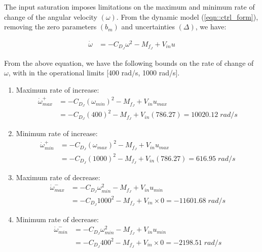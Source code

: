 The input saturation imposes limitations on the maximum and minimum rate of
change of the angular velocity $(\omega)$. From the dynamic model (\ref{eqn::ctrl_form}), removing the zero parameters
$(b_m)$ and uncertainties $(\Delta)$, we have:

\begin{align*}
    \dot \omega &= -C_{D_J} \omega^2 - M_{f_J} + V_{in} u
\end{align*}

From the above equation, we have the following bounds on the rate of change of
$\omega$, with in the operational limits [400 rad/s, 1000 rad/s].

\begin{enumerate}
    \item Maximum rate of increase:
    \begin{align*}
        \dot \omega^{+}_{max} &= -C_{D_J} (\omega_{min})^2 - M_{f_J}+ V_{in} u_{max}\\
                              &= -C_{D_J} (400)^2 - M_{f_J} + V_{in} (786.27)
                               =  10020.12 \; rad/s
    \end{align*}

    \item Minimum rate of increase:
    \begin{align*}
        \dot \omega^{+}_{min} &= -C_{D_J} (\omega_{max})^2 - M_{f_J}+ V_{in} u_{max}\\
                              &= -C_{D_J} (1000)^2 - M_{f_J} + V_{in} (786.27)
                               = 616.95 \; rad/s
    \end{align*}

    \item Maximum rate of decrease:
    \begin{align*}
        \dot \omega^{-}_{max} &= -C_{D_J} \omega_{min}^2 - M_{f_J} + V_{in} u_{min}\\
                              &= -C_{D_J} 1000^2 - M_{f_J} + V_{in} \times 0
                               = -11601.68 \; rad/s
    \end{align*}

    \item Minimum rate of decrease:
    \begin{align*}
        \dot \omega^{-}_{min} &= -C_{D_J} \omega_{min}^2 - M_{f_J} + V_{in} u_{min}\\
                              &= -C_{D_J} 400^2 - M_{f_J} + V_{in} \times 0
                               = -2198.51 \; rad/s
    \end{align*}
\end{enumerate}

